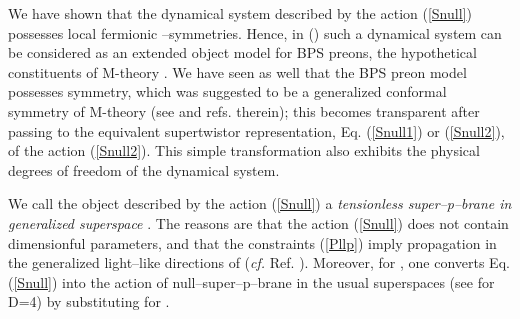 \documentclass[a4paper,11pt]{article}
\begin{document}
We have shown that the dynamical system described  by the action (\ref{Snull}) 
 possesses \coordHE{} local fermionic 
\myHighlight{$\kappa$}\coordHE{}--symmetries. Hence, in \coordHE{} (\coordHE{}) such a dynamical system  
 can be considered as 
an extended object model for BPS preons, the hypothetical constituents 
of M-theory \cite{BPS01}. 
We have seen as well that the BPS preon model possesses  
\coordHE{} symmetry, 
which was suggested to be a generalized conformal symmetry of M-theory 
(see \cite{Bars2t,West,BPS01} and refs. therein);  
this becomes transparent after passing to the equivalent  
supertwistor representation, Eq. (\ref{Snull1}) or (\ref{Snull2}), 
of the action (\ref{Snull2}). This simple transformation  also exhibits 
the physical  degrees of freedom of the dynamical system. 


We call the object described by the action 
(\ref{Snull}) a 
{\sl tensionless super--p--brane in generalized superspace} 
 \coordHE{}. The reasons are that  
the  action (\ref{Snull}) does not contain dimensionful parameters, and 
that the constraints (\ref{Pllp}) imply propagation in the 
generalized light--like directions of \coordHE{} 
({\it cf.} Ref. \cite{V01s}). 
Moreover, for \coordHE{}, 
one converts Eq. (\ref{Snull}) into the action of null--super--p--brane 
in the usual \coordHE{} superspaces (see \cite{BZ} for D=4) by 
substituting \coordHE{} for \coordHE{}. 
\end{document}
